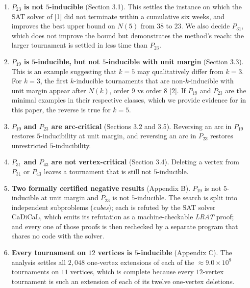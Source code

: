 \documentclass[
]{article}
\begin{document}
\begin{enumerate}
\def\labelenumi{\arabic{enumi}.}
\item
  \textbf{\(P_{23}\) is not \(5\)-inducible} (Section 3.1). This settles
  the instance on which the SAT solver of {[}1{]} did not terminate
  within a cumulative six weeks, and improves the best upper bound on
  \(N(5)\) from \(38\) to \(23\). We also decide \(P_{31}\), which does
  not improve the bound but demonstrates the method's reach: the larger
  tournament is settled in less time than \(P_{23}\).
\item
  \textbf{\(P_{19}\) is \(5\)-inducible, but not \(5\)-inducible with
  unit margin} (Section 3.3). This is an example suggesting that
  \(k = 5\) may qualitatively differ from \(k = 3\). For \(k = 3\), the
  first \(k\)-inducible tournaments that are non-\(k\)-inducible with
  unit margin appear after \(N(k)\), order 9 vs order 8 {[}2{]}. If
  \(P_{19}\) and \(P_{23}\) are the minimal examples in their respective
  classes, which we provide evidence for in this paper, the reverse is
  true for \(k = 5\).
\item
  \textbf{\(P_{19}\) and \(P_{23}\) are arc-critical} (Sections 3.2 and
  3.5). Reversing an arc in \(P_{19}\) restores \(5\)-inducibility at
  unit margin, and reversing an arc in \(P_{23}\) restores unrestricted
  \(5\)-inducibility.
\item
  \textbf{\(P_{31}\) and \(P_{43}\) are not vertex-critical} (Section
  3.4). Deleting a vertex from \(P_{31}\) or \(P_{43}\) leaves a
  tournament that is still not \(5\)-inducible.
\item
  \textbf{Two formally certified negative results} (Appendix B).
  \(P_{19}\) is not \(5\)-inducible at unit margin and \(P_{23}\) is not
  \(5\)-inducible. The search is split into independent subproblems
  (\emph{cubes}); each is refuted by the SAT solver CaDiCaL, which emits
  its refutation as a machine-checkable \emph{LRAT} proof; and every one
  of those proofs is then rechecked by a separate program that shares no
  code with the solver.
\item
  \textbf{Every tournament on \(12\) vertices is \(5\)-inducible}
  (Appendix C). The analysis settles all \(2{,}048\) one-vertex
  extensions of each of the \(\approx 9.0 \times 10^{8}\) tournaments on
  \(11\) vertices, which is complete because every \(12\)-vertex
  tournament is such an extension of each of its twelve one-vertex
  deletions.
\end{enumerate}
\end{document}

